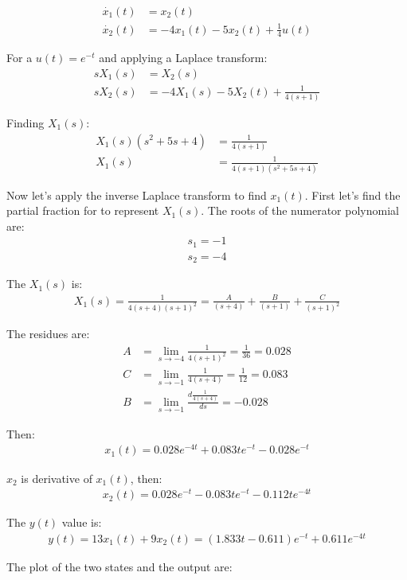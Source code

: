 \documentclass[a4paper,11pt]{article}
\begin{document}
\begin{align*}
\dot{x_1}(t) &= x_2(t)\\
\dot{x_2}(t) &= -4x_1(t)-5x_2(t)+\frac{1}{4}u(t)
\end{align*}
\par For a $u(t) = e^{-t}$ and applying a Laplace transform:
\begin{align*}
sX_1(s) &= X_2(s)\\
sX_2(s) &= -4X_1(s)-5X_2(t) +\frac{1}{4(s+1)}
\end{align*}
\par Finding $X_1(s)$:
\begin{align*}
X_1(s)(s^2+5s+4)&=\frac{1}{4(s+1)}\\
X_1(s)&=\frac{1}{4(s+1)(s^2+5s+4)}
\end{align*}
\par Now let's apply the inverse Laplace transform to find $x_1(t)$. First let's find the partial fraction for to represent $X_1(s)$. The roots of the numerator polynomial are:
\begin{align*}
s_1 = -1\\
s_2 = -4
\end{align*}
\par The $X_1(s)$ is:
\begin{align*}
X_1(s) = \frac{1}{4(s+4)(s+1)^2}=\frac{A}{(s+4)}+\frac{B}{(s+1)}+\frac{C}{(s+1)^2}
\end{align*}
\par The residues are:
\begin{align*}
A &= \lim_{s\rightarrow -4} \frac{1}{4(s+1)^2}=\frac{1}{36}=0.028\\
C &= \lim_{s\rightarrow -1} \frac{1}{4(s+4)}= \frac{1}{12}= 0.083\\
B &= \lim_{s\rightarrow -1} \frac{d\frac{1}{4(s+4)}}{ds}=-0.028
\end{align*}
\par Then:
\begin{align}
x_1(t)= 0.028e^{-4t}+0.083te^{-t}-0.028e^{-t}
\end{align}
\par $x_2$ is derivative of $x_1(t)$, then:
\begin{align}
x_2(t)= 0.028e^{-t}-0.083te^{-t}-0.112te^{-4t}
\end{align}
\par The $y(t)$ value is:
\begin{align}
y(t) = 13x_1(t) + 9x_2(t)=(1.833t - 0.611)e^{-t} + 0.611e^{-4t}
\end{align}
\par The plot of the two states and the output are:
\end{document}
